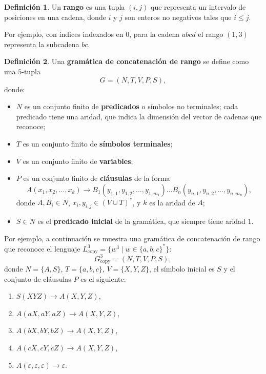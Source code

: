 \documentclass{report}
\theoremstyle{definition}
\newtheorem{definicion}{Definición}[chapter]
\theoremstyle{plain}
\theoremstyle{remark}
\begin{document}
\begin{definicion}
Un \textbf{rango} es una tupla $(i, j)$ que representa un intervalo de
posiciones en una cadena, donde $i$ y $j$ son enteros no negativos tales
que $i \le j$.
\end{definicion}

Por ejemplo, con índices indexados en $0$, para la cadena $abcd$ el
rango $(1, 3)$ representa la subcadena $bc$.

\begin{definicion}
Una \textbf{gramática de concatenación de rango} se define como una
$5$-tupla
\[
  G = (N, T, V, P, S),
\]
donde:
\begin{itemize}
  \item $N$ es un conjunto finito de \textbf{predicados} o símbolos no
    terminales; cada predicado tiene una aridad, que indica la dimensión
    del vector de cadenas que reconoce;
  \item $T$ es un conjunto finito de \textbf{símbolos terminales};
  \item $V$ es un conjunto finito de \textbf{variables};
  \item $P$ es un conjunto finito de \textbf{cláusulas} de la forma
    \[
      A(x_1, x_2, \dots, x_k) \to B_1(y_{1,1}, y_{1,2}, \dots, y_{1,m_1})
      \dots B_n(y_{n,1}, y_{n,2}, \dots, y_{n,m_n}),
    \]
    donde $A, B_i \in N$, $x_i, y_{i,j} \in (V \cup T)^*$, y $k$ es la
    aridad de $A$;
  \item $S \in N$ es el \textbf{predicado inicial} de la gramática, que
    siempre tiene aridad $1$.
\end{itemize}
\end{definicion}

Por ejemplo, a continuación se muestra una gramática de concatenación
de rango que reconoce el lenguaje $L_{\mathrm{copy}}^3 = \{ w^3 \mid w
\in \{a, b, c\}^* \}$:
\[
  G_{\mathrm{copy}}^3 = (N, T, V, P, S),
\]
donde $N = \{A, S\}$, $T = \{a, b, c\}$, $V = \{X, Y, Z\}$, el símbolo
inicial es $S$ y el conjunto de cláusulas $P$ es el siguiente:
\begin{enumerate}
  \item $S(XYZ) \to A(X, Y, Z)$,
  \item $A(aX, aY, aZ) \to A(X, Y, Z)$,
  \item $A(bX, bY, bZ) \to A(X, Y, Z)$,
  \item $A(cX, cY, cZ) \to A(X, Y, Z)$,
  \item $A(\varepsilon, \varepsilon, \varepsilon) \to \varepsilon$.
\end{enumerate}
\end{document}
